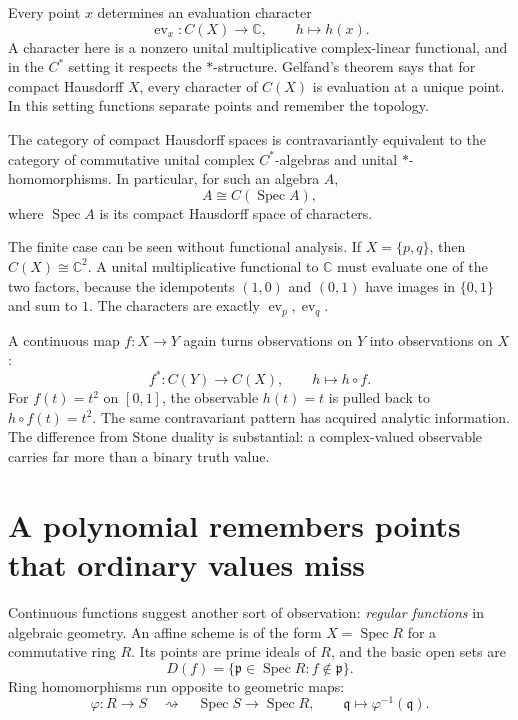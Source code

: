 Every point $x$ determines an evaluation character
\[
 \operatorname{ev}_x:C(X)\to\mathbb C,\qquad h\mapsto h(x).
\]
A character here is a nonzero unital multiplicative complex-linear functional, and in the $C^*$ setting it respects the $*$-structure. Gelfand's theorem says that for compact Hausdorff $X$, every character of $C(X)$ is evaluation at a unique point. In this setting functions separate points and remember the topology.

\begin{theorem}
The category of compact Hausdorff spaces is contravariantly equivalent to the category of commutative unital complex $C^*$-algebras and unital $*$-homomorphisms. In particular, for such an algebra $A$,
\[
 \boxed{A\cong C(\operatorname{Spec}A),}
\]
where $\operatorname{Spec}A$ is its compact Hausdorff space of characters.
\end{theorem}

The finite case can be seen without functional analysis. If $X=\{p,q\}$, then $C(X)\cong\mathbb C^2$. A unital multiplicative functional to $\mathbb C$ must evaluate one of the two factors, because the idempotents $(1,0)$ and $(0,1)$ have images in $\{0,1\}$ and sum to $1$. The characters are exactly $\operatorname{ev}_p,\operatorname{ev}_q$.

A continuous map $f:X\to Y$ again turns observations on $Y$ into observations on $X$:
\[
 f^*:C(Y)\to C(X),\qquad h\longmapsto h\circ f.
\]
For $f(t)=t^2$ on $[0,1]$, the observable $h(t)=t$ is pulled back to $h\circ f(t)=t^2$. The same contravariant pattern has acquired analytic information. The difference from Stone duality is substantial: a complex-valued observable carries far more than a binary truth value.


\section{A polynomial remembers points that ordinary values miss}

Continuous functions suggest another sort of observation: \emph{regular functions} in algebraic geometry. An affine scheme is of the form $X=\operatorname{Spec}R$ for a commutative ring $R$. Its points are prime ideals of $R$, and the basic open sets are
\[
 D(f)=\{\mathfrak p\in\operatorname{Spec}R:f\notin\mathfrak p\}.
\]
Ring homomorphisms run opposite to geometric maps:
\[
 \varphi:R\to S
 \quad\rightsquigarrow\quad
 \operatorname{Spec}S\to\operatorname{Spec}R,
 \qquad\mathfrak q\mapsto\varphi^{-1}(\mathfrak q).
\]

